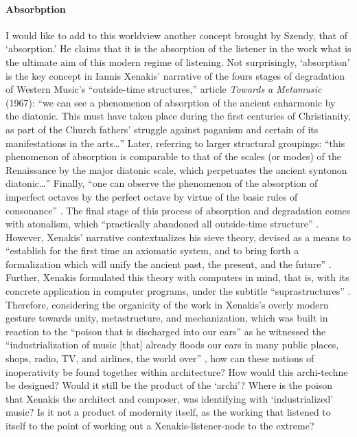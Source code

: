 \paragraph{Absorbption}
I would like to add to this worldview another concept brought by Szendy, that of `absorption.' He claims that it is the absorption of the listener in the work what is the ultimate aim of this modern regime of listening. Not surprisingly, `absorption' is the key concept in Iannis Xenakis' narrative of the fours stages of degradation of Western Music's ``outside-time structures,'' article \textit{Towards a Metamusic} (1967): ``we can see a phenomenon of absorption of the ancient enharmonic by the diatonic. This must have taken place during the first centuries of Christianity, as part of the Church fathers' struggle against paganism and certain of its manifestations in the arts\dots'' Later, referring to larger structural groupings: ``this phenomenon of absorption is comparable to that of the scales (or modes) of the Renaissance by the major diatonic scale, which perpetuates the ancient syntonon diatonic\dots'' Finally, ``one can observe the phenomenon of the absorption of imperfect octaves by the perfect octave by virtue of the basic rules of consonance'' \parencite[189-190]{Xen92:For}. The final stage of this process of absorption and degradation comes with atonalism, which ``practically abandoned all outside-time structure'' \parencite[193]{Xen92:For}. However, Xenakis' narrative contextualizes his sieve theory, devised as a means to ``establish for the first time an axiomatic system, and to bring forth a formalization which will unify the ancient past, the present, and the future'' \parencite[182]{Xen92:For}. Further, Xenakis formulated this theory with computers in mind, that is, with its concrete application in computer programs, under the subtitle ``suprastructures'' \parencite[200]{Xen92:For}. Therefore, considering the organicity of the work in Xenakis's overly modern gesture towards unity, metastructure, and mechanization, which was built in reaction to the ``poison that is discharged into our ears'' as he witnessed the ``industrialization of music [that] already floods our ears in many public places, shops, radio, TV, and airlines, the world over'' \parencite[200]{Xen92:For}, how can these notions of inoperativity be found together within architecture? How would this archi-techne be designed? Would it still be the product of the `archi'? Where is the poison that Xenakis the architect and  composer, was identifying with `industrialized' music? Is it not a product of modernity itself, as the working that listened to itself to the point of working out a Xenakis-listener-node to the extreme? 
